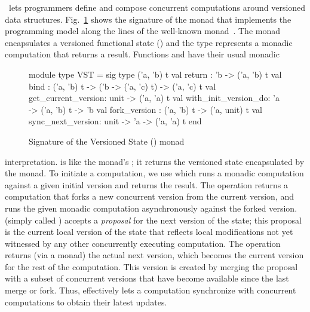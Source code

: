 \name\ lets programmers define and compose concurrent computations
around versioned data structures.  Fig.~\ref{fig:dali-monad} shows the
signature of the \nameMonad monad that implements the programming
model along the lines of the well-known 
monad~\cite{wadler-monad}. The monad encapsulates a versioned
functional state () and the type  represents a
monadic computation that returns a  result.  Functions
 and  have their usual monadic
\begin{figure}
\begin{center}
  \begin{ocaml}
  module type VST = sig
    type ('a, 'b) t
    val return : 'b -> ('a, 'b) t
    val bind : ('a, 'b) t -> ('b -> ('a, 'c) t) -> ('a, 'c) t
    val get_current_version: unit -> ('a, 'a) t
    val with_init_version_do: 'a -> ('a, 'b) t -> 'b
    val fork_version : ('a, 'b) t -> ('a, unit) t
    val sync_next_version: unit -> 'a -> ('a, 'a) t
  end
  \end{ocaml}
  \caption{Signature of the Versioned State (\nameMonad) monad}
  \label{fig:dali-monad}
\end{center}
\end{figure}
interpretation.  is like the 
monad's ; it returns the versioned state encapsulated by the
monad. To initiate a computation, we use 
which runs a monadic computation against a given initial version and
returns the result. The  operation returns a
computation that forks a new concurrent version from the current
version, and runs the given monadic computation asynchronously against
the forked version.   (simply called )
accepts a \emph{proposal} for the next version of the state; this
proposal is the current local version of the state that reflects local
modifications not yet witnessed by any other concurrently executing
computation.  The operation returns (via a monad) the actual next
version, which becomes the current version for the rest of the
computation.  This version is created by merging the proposal with a
subset of concurrent versions that have become available since the
last merge or fork. Thus,  effectively lets a computation
synchronize with concurrent computations to obtain their latest
updates.

